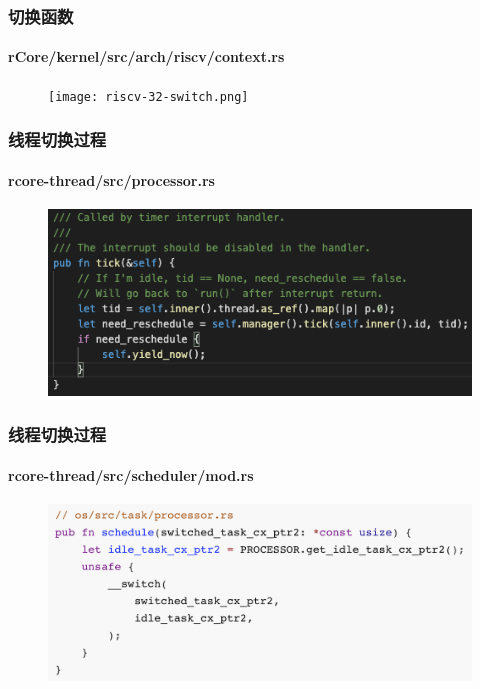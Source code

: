 \begin{frame}[fragile]
    \frametitle{切换函数}
    \framesubtitle{rCore/kernel/src/arch/riscv/context.rs}
    \begin{figure}
    \texttt{[image: riscv-32-switch.png]}
    \end{figure}

\end{frame}
% 
% 
% 
% 
% 
\begin{frame}[fragile]
    \frametitle{线程切换过程}
    \framesubtitle{rcore-thread/src/processor.rs}
    \begin{figure}
    \includegraphics[width=1.0\linewidth]{figs/fn-tick.png}
    \end{figure}
\end{frame}

\begin{frame}[fragile]
    \frametitle{线程切换过程}
    \framesubtitle{rcore-thread/src/scheduler/mod.rs}
    \begin{figure}
    \includegraphics[width=0.65\linewidth]{figs/scheduler.png}
    \end{figure}

\end{frame}
% 
% 
% 
% 
% 
